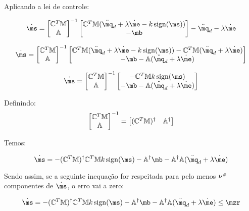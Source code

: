 Aplicando a lei de controle:

$$ \dot{\ms} =  \begin{bmatrix}
\mC^T \mM \\
\mA
\end{bmatrix}^{-1}
\begin{bmatrix}
 \mC^T \mM (\ddot{\mq}_d + \lambda \dot{\me} - k  \sign (\ms)) \\
-\mb
\end{bmatrix}
 - \ddot{\mq}_d  - \lambda \dot{\me} $$
 
 $$ \dot{\ms} =  \begin{bmatrix}
\mC^T \mM \\
\mA
\end{bmatrix}^{-1}
\begin{bmatrix}
 \mC^T \mM (\ddot{\mq}_d + \lambda \dot{\me} - k  \sign (\ms)) -  \mC^T \mM(\ddot{\mq}_d  + \lambda \dot{\me}) \\
-\mb - \mA(\ddot{\mq}_d  + \lambda \dot{\me})
\end{bmatrix} $$

 $$ \dot{\ms} =  \begin{bmatrix}
\mC^T \mM \\
\mA
\end{bmatrix}^{-1}
\begin{bmatrix}
- \mC^T \mM  k  \sign (\ms) \\
-\mb - \mA(\ddot{\mq}_d  + \lambda \dot{\me})
\end{bmatrix} $$

Definindo:
$$\begin{bmatrix}
\mathbb{C}^T \mathbb{M} \\
\mathbb{A}
\end{bmatrix}^{-1}
=
\begin{bmatrix}
(\mathbb{C}^T \mathbb{M})^\dagger & \mathbb{A}^\dagger
\end{bmatrix} $$

Temos:

$$\dot{\ms} = 
- (\mC^T \mM)^\dagger \mC^T \mM  k  \sign (\ms) - \mA^\dagger\mb - \mA^\dagger \mA(\ddot{\mq}_d  + \lambda \dot{\me}) $$

Sendo assim, se a seguinte inequação for respeitada para pelo menos $\nu^{\scriptscriptstyle \#}$ componentes de $\dot{\ms}$, o erro vai a zero:

$$\dot{\ms} = 
- (\mC^T \mM)^\dagger \mC^T \mM  k  \sign (\ms) - \mA^\dagger\mb - \mA^\dagger \mA(\ddot{\mq}_d  + \lambda \dot{\me}) \leq \mzr $$